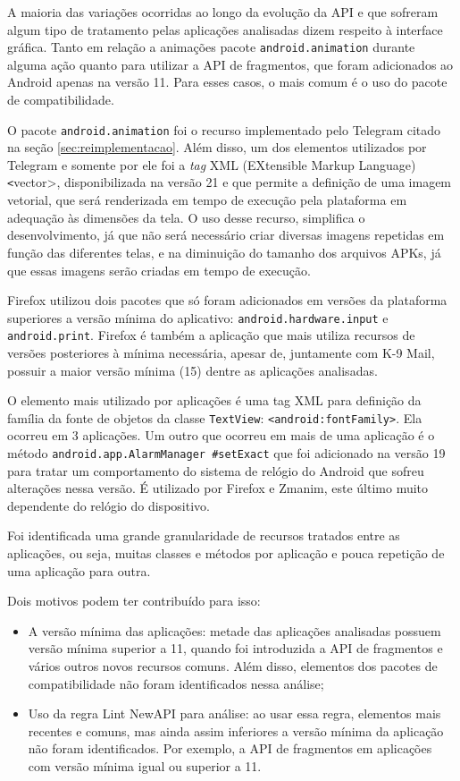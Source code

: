 A maioria das variações ocorridas ao longo da evolução da API e que sofreram algum
tipo de tratamento pelas aplicações analisadas dizem respeito à interface gráfica.
Tanto em relação a animações pacote \texttt{android.animation} durante alguma ação
quanto para utilizar a API de fragmentos, que foram adicionados ao Android apenas
na versão 11. Para esses casos, o mais comum é o uso do pacote de compatibilidade.

O pacote \texttt{android.animation} foi o recurso implementado pelo Telegram citado
na seção \ref{sec:reimplementacao}. Além disso, um dos elementos utilizados por
Telegram e somente por ele foi a \textit{tag} XML (EXtensible Markup Language) \texttt<vector>,
disponibilizada
na versão 21 e que permite a definição de uma imagem vetorial, que será renderizada
em tempo de execução pela plataforma em adequação às dimensões da tela. O uso desse
recurso, simplifica o desenvolvimento, já que não será necessário criar diversas
imagens repetidas em função das diferentes telas, e na diminuição do tamanho dos
arquivos APKs, já que essas imagens serão criadas em tempo de execução.

Firefox utilizou dois pacotes que só foram adicionados em versões da plataforma
superiores a versão mínima do aplicativo: \texttt{android.hardware.input} e
\texttt{android.print}. Firefox é também a aplicação que mais utiliza recursos
de versões posteriores à mínima necessária, apesar de, juntamente com K-9 Mail,
possuir a maior versão mínima (15) dentre as aplicações analisadas.

O elemento mais utilizado por aplicações é uma tag XML para definição da família
da fonte de objetos da classe \texttt{TextView}: \texttt{<android:fontFamily>}.
Ela ocorreu em 3 aplicações. Um outro que ocorreu em mais de uma aplicação é o
método \texttt{android.app.AlarmManager \#setExact} que foi adicionado na versão
19 para tratar um comportamento do sistema de relógio do Android que sofreu
alterações nessa versão. É utilizado por Firefox e Zmanim, este último muito
dependente do relógio do dispositivo.

Foi identificada uma grande granularidade de recursos tratados entre as aplicações,
ou seja, muitas classes e métodos por aplicação e pouca repetição de uma aplicação
para outra.
 
Dois motivos podem ter contribuído para isso:
\begin{itemize}
    \item A versão mínima das aplicações: metade das aplicações analisadas possuem
        versão mínima superior a 11, quando foi introduzida a API de fragmentos e
        vários outros novos recursos comuns. Além disso, elementos dos pacotes
        de compatibilidade não foram identificados nessa análise;
   \item Uso da regra Lint NewAPI para análise: ao usar essa regra, elementos
        mais recentes e comuns, mas ainda assim inferiores a versão mínima da
        aplicação não foram identificados. Por exemplo, a API de fragmentos em
        aplicações com versão mínima igual ou superior a 11.
\end{itemize}


